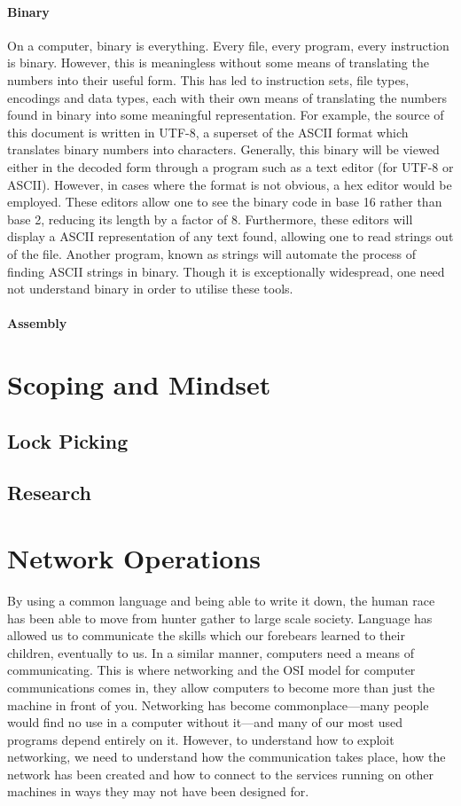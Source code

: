 \documentclass[a4paper,11pt]{report}
\begin{document}
		\subsubsection{Binary}
			On a computer, binary is everything.
			Every file, every program, every instruction is binary. 
			However, this is meaningless without some means of translating the numbers into their useful form. 
			This has led to instruction sets, file types, encodings and data types, each with their own means of translating the numbers found in binary into some meaningful representation. 
			For example, the source of this document is written in UTF-8, a superset of the ASCII format which translates binary numbers into characters. 
			Generally, this binary will be viewed either in the decoded form through a program such as a text editor (for UTF-8 or ASCII). 
			However, in cases where the format is not obvious, a hex editor would be employed. 
			These editors allow one to see the binary code in base 16 rather than base 2, reducing its length by a factor of 8. 
			Furthermore, these editors will display a ASCII representation of any text found, allowing one to read strings out of the file. 
			Another program, known as strings will automate the process of finding ASCII strings in binary. 
			Though it is exceptionally widespread, one need not understand binary in order to utilise these tools. 
		\subsubsection{Assembly}
\chapter{Scoping and Mindset}
	\label{ch:ScopingMindset}
	\section{Lock Picking}
	\section{Research}
\chapter{Network Operations}
	\label{ch:NetworkOperations}
	By using a common language and being able to write it down, the human race has been able to move from hunter gather to large scale society. 
	Language has allowed us to communicate the skills which our forebears learned to their children, eventually to us. 
	In a similar manner, computers need a means of communicating. 
	This is where networking and the OSI model for computer communications comes in, they allow computers to become more than just the machine in front of you. 
	Networking has become commonplace---many people would find no use in a computer without it---and many of our most used programs depend entirely on it. 
	However, to understand how to exploit networking, we need to understand how the communication takes place, how the network has been created and how to connect to the services running on other machines in ways they may not have been designed for. 
\end{document}
